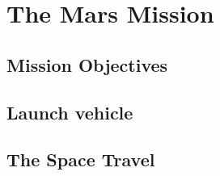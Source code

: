 \chapter{The Mars Mission}
\section{Mission Objectives}
\section{Launch vehicle}
\section{The Space Travel}